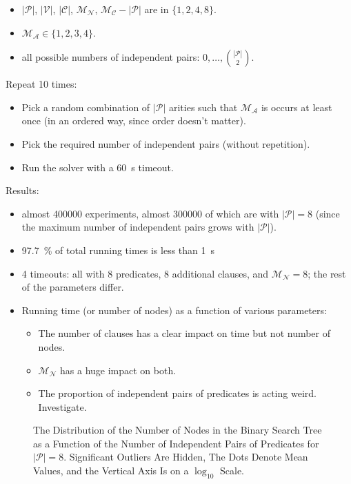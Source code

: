 \documentclass[letterpaper]{article}
\theoremstyle{definition}
\newcommand{\predicates}{\mathcal{P}}
\newcommand{\variables}{\mathcal{V}}
\newcommand{\constants}{\mathcal{C}}
\newcommand{\maxArity}{\mathcal{M}_{\mathcal{A}}}
\newcommand{\maxNumNodes}{\mathcal{M}_{\mathcal{N}}}
\newcommand{\maxNumClauses}{\mathcal{M}_{\mathcal{C}}}
\begin{document}
\begin{itemize}
\item $|\predicates{}|$, $|\variables{}|$, $|\constants{}|$, $\maxNumNodes{}$,
  $\maxNumClauses{} - |\predicates{}|$ are in $\{ 1, 2, 4, 8 \}$.
\item $\maxArity{} \in \{ 1, 2, 3, 4 \}$.
\item all possible numbers of independent pairs: $0, \dots,
  \binom{|\predicates{}|}{2}$.
\end{itemize}
Repeat 10 times:
\begin{itemize}
\item Pick a random combination of $|\predicates{}|$ arities such that
  $\maxArity{}$ is occurs at least once (in an ordered way, since order doesn't
  matter).
\item Pick the required number of independent pairs (without repetition).
\item Run the solver with a \SI{60}{\second} timeout.
\end{itemize}

Results:
\begin{itemize}
\item almost \num{400000} experiments, almost \num{300000} of which are with
  $|\predicates{}| = 8$ (since the maximum number of independent pairs grows
  with $|\predicates{}|$).
\item \SI{97.7}{\percent} of total running times is less than \SI{1}{\second}
\item 4 timeouts: all with 8 predicates, 8 additional clauses, and
  $\maxNumNodes{} = 8$; the rest of the parameters differ.
\item Running time (or number of nodes) as a function of various parameters:
  \begin{itemize}
  \item The number of clauses has a clear impact on time but not number of
    nodes.
  \item $\maxNumNodes{}$ has a huge impact on both.
  \item The proportion of independent pairs of predicates is acting weird.
    Investigate.
  \end{itemize}
\end{itemize}

\begin{figure*}[t]
  \centering
  
  \caption{The Distribution of the Number of Nodes in the Binary Search Tree as
    a Function of the Number of Independent Pairs of Predicates for
    $|\predicates| = 8$. Significant Outliers Are Hidden, The Dots Denote Mean
    Values, and the Vertical Axis Is on a $\log_{10}$ Scale.}
\end{figure*}
\end{document}
